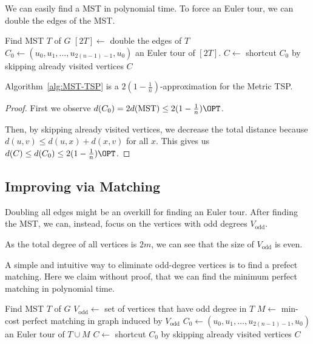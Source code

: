 We can easily find a MST in polynomial time. To force an Euler tour, we can double the edges of the MST.

\begin{algorithm}[H]
	\caption{MST-based TSP Approximation} \label{alg:MST-TSP}
	Find MST $T$ of $G$\;
	$[2T]\gets$ double the edges of $T$\;
	$C_0 \gets(u_0, u_1, \ldots, u_{2(n-1)-1}, u_0)$ an Euler tour of $[2T]$.
	$C \gets$ shortcut $C_0$ by skipping already visited vertices\;
	\Return $C$\;
\end{algorithm}

\begin{theorem}
	Algorithm~\ref{alg:MST-TSP} is a $2(1-\frac{1}{n})$-approximation for the Metric TSP.
\end{theorem}
\begin{proof}
	First we observe $d(C_0) = 2d(\text{MST}) \le 2(1-\frac{1}{n})\OPT$.

	Then, by skipping already visited vertices, we decrease the total distance because $d(u,v)\le d(u,x)+d(x,v)$ for all $x$.
	This gives us $d(C) \le d(C_0) \le 2(1-\frac{1}{n})\OPT$.
\end{proof}

\subsection{Improving via Matching}

Doubling all edges might be an overkill for finding an Euler tour.
After finding the MST, we can, instead, focus on the vertices with odd degrees $V_\text{odd}$.

As the total degree of all vertices is $2m$, we can see that the size of $V_\text{odd}$ is even.

A simple and intuitive way to eliminate odd-degree vertices is to find a prefect matching. Here we claim without proof, that we can find the minimum perfect matching in polynomial time.

\begin{algorithm}[H]
	\caption{Better TSP Approximation} \label{alg:better-TSP}
	Find MST $T$ of $G$\;
	$V_\text{odd}\gets$ set of vertices that have odd degree in $T$\;
	$M\gets$ min-cost perfect matching in graph induced by $V_\text{odd}$\;
	$C_0 \gets(u_0, u_1, \ldots, u_{2(n-1)-1}, u_0)$ an Euler tour of $T\cup M$\;
	$C \gets$ shortcut $C_0$ by skipping already visited vertices\;
	\Return $C$\;
\end{algorithm}

